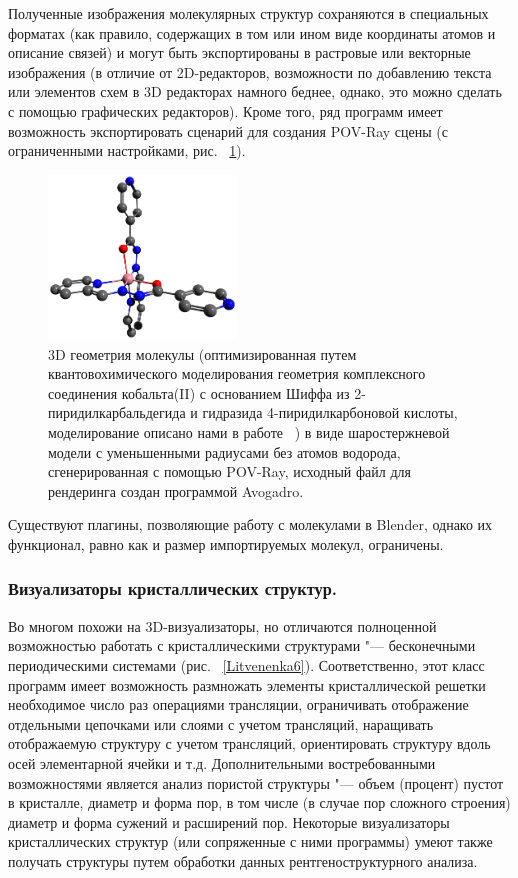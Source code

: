 \documentclass[10pt, a5paper]{article}
\begin{document}
Полученные изображения молекулярных структур сохраняются в специальных форматах (как правило, содержащих в том или ином виде координаты атомов и описание связей) и могут быть экспортированы в растровые или векторные изображения (в отличие от 2D-редакторов, возможности по добавлению текста или элементов схем в 3D редакторах намного беднее, однако, это можно сделать с помощью графических редакторов). Кроме того, ряд программ имеет возможность экспортировать сценарий для создания POV-Ray сцены (с ограниченными настройками, рис. ~\ref{Litvenenka5}).

\begin{figure}[h!]
  \centering
  \includegraphics[width=5cm]{20_2016_Litvenenka5.png}
  \caption{3D геометрия молекулы (оптимизированная путем квантовохимического моделирования геометрия комплексного соединения кобальта(II) с основанием Шиффа из 2-пиридилкарбальдегида и гидразида 4-пиридилкарбоновой кислоты, моделирование описано нами в работе ~\cite{Litvenenka3}) в виде шаростержневой модели с уменьшенными радиусами без атомов водорода, сгенерированная с помощью POV-Ray, исходный файл для рендеринга создан программой Avogadro.}
  \label{Litvenenka5}
\end{figure} 
  
Существуют плагины, позволяющие работу с молекулами в \linebreak Blender, однако их функционал, равно как и размер импортируемых молекул, ограничены.

\subsubsection*{Визуализаторы кристаллических структур.}

Во многом похожи на 3D-визуализаторы, но отличаются полноценной возможностью работать с кристаллическими структурами "--- бесконечными периодическими системами (рис. ~\ref{Litvenenka6}). Соответственно, этот класс программ имеет возможность размножать элементы кристаллической решетки необходимое число раз операциями трансляции, ограничивать отображение отдельными цепочками или слоями с учетом трансляций, наращивать отображаемую структуру с учетом трансляций, ориентировать структуру вдоль осей элементарной ячейки и т.д. Дополнительными востребованными возможностями является анализ пористой структуры "--- объем (процент) пустот в кристалле, диаметр и форма пор, в том числе (в случае пор сложного строения) диаметр и форма сужений и расширений пор. Некоторые визуализаторы кристаллических структур (или сопряженные с ними программы) умеют также получать структуры путем обработки данных рентгеноструктурного анализа.
\end{document}
